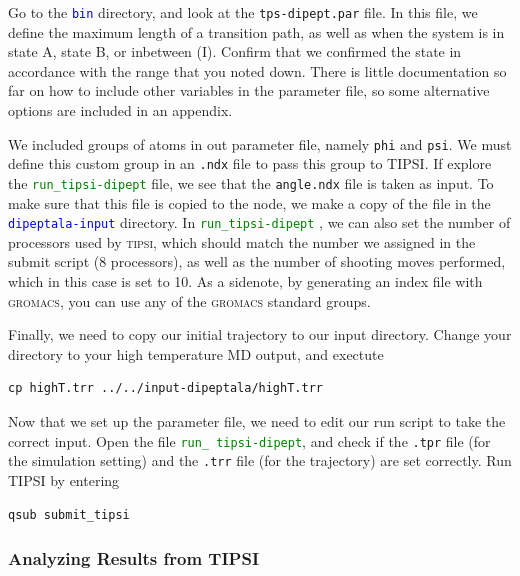 \documentclass[]{article}
\begin{document}
Go to the \textcolor{blue}{\texttt{bin}} directory, and look at the \texttt{tps-dipept.par} file. In this file, we define the maximum length of a transition path, as well as when the system is in state A, state B, or inbetween (I). Confirm that we confirmed the state in accordance with the range that you noted down. There is little documentation so far on how to include other variables in the parameter file, so some alternative options are included in an appendix.

We included groups of atoms in out parameter file, namely \texttt{phi} and \texttt{psi}. We must define this custom group in an \texttt{.ndx} file to pass this group to TIPSI. If explore the \textcolor{green}{\texttt{run\_tipsi-dipept}} file, we see that the \texttt{angle.ndx} file is taken as input. To make sure that this file is copied to the node, we make a copy of the file in the \textcolor{blue}{\texttt{dipeptala-input}} directory. In \textcolor{green}{\texttt{run\_tipsi-dipept}} , we can also set the number of processors used by \textsc{tipsi}, which should match the number we assigned in the submit script (8 processors), as well as the number of shooting moves performed, which in this case is set to 10. As a sidenote, by generating an index file with \textsc{gromacs}, you can use any of the \textsc{gromacs} standard groups. 

Finally, we need to copy our initial trajectory to our input directory. Change your directory to your high temperature MD output, and exectute 
%
\begin{lstlisting}
cp highT.trr ../../input-dipeptala/highT.trr
\end{lstlisting}
%

Now that we set up the parameter file, we need to edit our run script to take the correct input. Open the file \textcolor{green}{\texttt{run\_ tipsi-dipept}}, and check if the \texttt{.tpr} file (for the simulation setting) and the \texttt{.trr} file (for the trajectory) are set correctly. Run \textsc{TIPSI} by entering
%
\begin{lstlisting}
qsub submit_tipsi
\end{lstlisting}
%

\subsubsection*{Analyzing Results from TIPSI}
\end{document}
